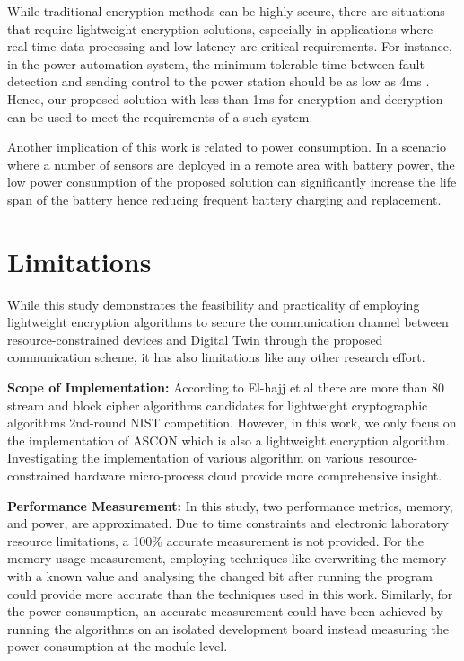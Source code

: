 

While traditional encryption methods can be highly secure, there are situations that require lightweight encryption solutions, especially in applications where real-time data processing and low latency are critical requirements. For instance, in the power automation system, the minimum tolerable time between fault detection and sending control to the power station should be as low as 4ms \cite{rajkumar_cyber_2020}. Hence, our proposed solution with less than 1ms for encryption and decryption can be used to meet the requirements of a such system. 

Another implication of this work is related to power consumption. In a scenario where a number of sensors are deployed in a remote area with battery power, the low power consumption of the proposed solution can significantly increase the life span of the battery hence reducing frequent battery charging and replacement. 

\section{Limitations}
While this study demonstrates the feasibility and practicality of employing lightweight encryption algorithms to secure the communication channel between resource-constrained devices and Digital Twin through the proposed communication scheme, it has also limitations like any other research effort.

\textbf{{Scope of Implementation:}} According to El-hajj et.al \cite{el-hajj_analysis_2023} there are more than 80 stream and block cipher algorithms candidates for lightweight cryptographic algorithms 2nd-round NIST competition. However, in this work, we only focus on the implementation of ASCON which is also a lightweight encryption algorithm. Investigating the implementation of various algorithm on various resource-constrained hardware micro-process cloud provide more comprehensive insight. 

\textbf{Performance Measurement:} In this study, two performance metrics, memory, and power, are approximated. Due to time constraints and electronic laboratory resource limitations, a 100\% accurate measurement is not provided. For the memory usage measurement, employing techniques like overwriting the memory with a known value and analysing the changed bit after running the program could provide more accurate than the techniques used in this work. Similarly, for the power consumption, an accurate measurement could have been achieved by running the algorithms on an isolated development board instead measuring the power consumption at the module level. 

